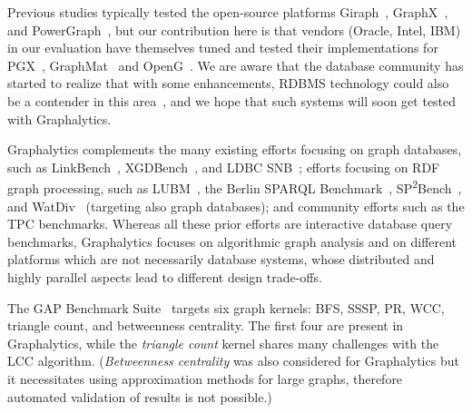 Previous studies typically tested the open-source platforms Giraph~\cite{DBLP:books/sp/SOAK2016}, GraphX~\cite{DBLP:conf/sigmod/XinGFS13}, and 
PowerGraph~\cite{DBLP:conf/osdi/GonzalezLGBG12}, but our contribution here is that vendors (Oracle, Intel, IBM) in our evaluation have themselves tuned and tested their implementations for PGX~\cite{DBLP:conf/sc/HongDMLVC15}, GraphMat~\cite{DBLP:journals/pvldb/SundaramSPDAV0D15} and OpenG~\cite{DBLP:conf/sc/NaiXTKL15}. We are aware that the database community has started to realize that with some enhancements, RDBMS technology could also be a contender in this area~\cite{DBLP:conf/cidr/FanRP15,DBLP:journals/pvldb/JindalR0MDS14}, and we hope that such systems will soon get tested with Graphalytics. 

Graphalytics complements the many existing efforts focusing on graph databases, such as 
LinkBench~\cite{DBLP:conf/sigmod/ArmstrongPBC13}, 
XGDBench~\cite{DBLP:journals/ase/DayarathnaS14}, and 
LDBC SNB~\cite{DBLP:conf/sigmod/ErlingALCGPPB15,DBLP:conf/grades/SzarnyasPAMPKEB18};  
efforts focusing on RDF graph processing, such as 
LUBM~\cite{DBLP:journals/ws/GuoPH05},
the Berlin {SPARQL} Benchmark~\cite{DBLP:journals/ijswis/BizerS09},
SP\textsuperscript{2}Bench~\cite{DBLP:conf/icde/SchmidtHLP09},
and WatDiv~\cite{DBLP:conf/semweb/AlucHOD14} (targeting also graph databases);
and community efforts such as the TPC benchmarks.
Whereas all these prior efforts are interactive database query benchmarks, Graphalytics focuses on algorithmic graph analysis and on different platforms which are not necessarily database systems, whose distributed and highly parallel aspects lead to different design trade-offs.

The GAP Benchmark Suite~\cite{DBLP:journals/corr/BeamerAP15} targets six graph kernels: BFS, SSSP, PR, WCC, triangle count, and betweenness centrality. The first four are present in Graphalytics, while the \emph{triangle count} kernel shares many challenges with the LCC algorithm. (\emph{Betweenness centrality} was also considered for Graphalytics but it necessitates using approximation methods for large graphs, therefore automated validation of results is not possible.)
